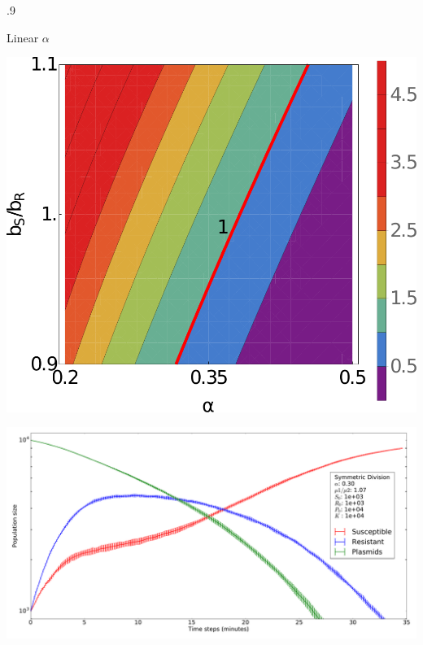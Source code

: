 \documentclass[final]{beamer}
\newlength{\onecolwid}
\newlength{\figwid}
\begin{document}
\begin{frame}[t]
\begin{block}
\begin{columns}[t]
\begin{column}{.9\onecolwid}
  \begin{block}{Linear $\alpha$}
    \begin{center}
      \includegraphics[width=\figwid]{../dev/graphics/poster/linear_contour.pdf}

      \includegraphics[width=\figwid]{../dev/graphics/poster/linear_pop.pdf}
    \end{center}


\end{block}
\end{column}
\end{columns}
\end{block}
\end{frame}
\end{document}
